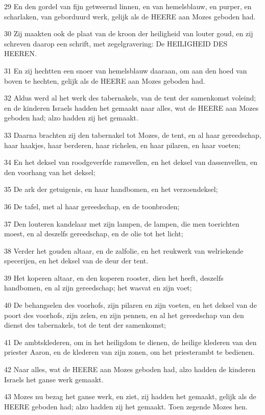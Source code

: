 \par 29 En den gordel van fijn getweernd linnen, en van hemelsblauw, en purper, en scharlaken, van geborduurd werk, gelijk als de HEERE aan Mozes geboden had.
\par 30 Zij maakten ook de plaat van de kroon der heiligheid van louter goud, en zij schreven daarop een schrift, met zegelgravering: De HEILIGHEID DES HEEREN.
\par 31 En zij hechtten een snoer van hemelsblauw daaraan, om aan den hoed van boven te hechten, gelijk als de HEERE aan Mozes geboden had.
\par 32 Aldus werd al het werk des tabernakels, van de tent der samenkomst voleind; en de kinderen Israels hadden het gemaakt naar alles, wat de HEERE aan Mozes geboden had; alzo hadden zij het gemaakt.
\par 33 Daarna brachten zij den tabernakel tot Mozes, de tent, en al haar gereedschap, haar haakjes, haar berderen, haar richelen, en haar pilaren, en haar voeten;
\par 34 En het deksel van roodgeverfde ramsvellen, en het deksel van dassenvellen, en den voorhang van het deksel;
\par 35 De ark der getuigenis, en haar handbomen, en het verzoendeksel;
\par 36 De tafel, met al haar gereedschap, en de toonbroden;
\par 37 Den louteren kandelaar met zijn lampen, de lampen, die men toerichten moest, en al deszelfs gereedschap, en de olie tot het licht;
\par 38 Verder het gouden altaar, en de zalfolie, en het reukwerk van welriekende specerijen, en het deksel van de deur der tent.
\par 39 Het koperen altaar, en den koperen rooster, dien het heeft, deszelfs handbomen, en al zijn gereedschap; het wasvat en zijn voet;
\par 40 De behangselen des voorhofs, zijn pilaren en zijn voeten, en het deksel van de poort des voorhofs, zijn zelen, en zijn pennen, en al het gereedschap van den dienst des tabernakels, tot de tent der samenkomst;
\par 41 De ambtsklederen, om in het heiligdom te dienen, de heilige klederen van den priester Aaron, en de klederen van zijn zonen, om het priesterambt te bedienen.
\par 42 Naar alles, wat de HEERE aan Mozes geboden had, alzo hadden de kinderen Israels het ganse werk gemaakt.
\par 43 Mozes nu bezag het ganse werk, en ziet, zij hadden het gemaakt, gelijk als de HEERE geboden had; alzo hadden zij het gemaakt. Toen zegende Mozes hen.

